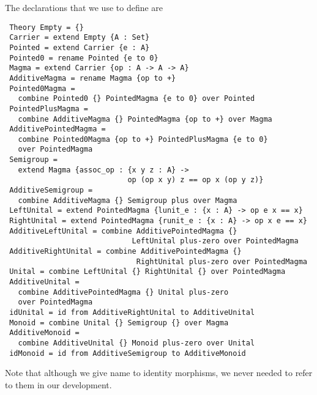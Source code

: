 The declarations that we use to define  are 
\begin{verbatim} 
 Theory Empty = {} 
 Carrier = extend Empty {A : Set}
 Pointed = extend Carrier {e : A}
 Pointed0 = rename Pointed {e to 0} 
 Magma = extend Carrier {op : A -> A -> A}
 AdditiveMagma = rename Magma {op to +} 
 Pointed0Magma = 
   combine Pointed0 {} PointedMagma {e to 0} over Pointed
 PointedPlusMagma = 
   combine AdditiveMagma {} PointedMagma {op to +} over Magma
 AdditivePointedMagma = 
   combine Pointed0Magma {op to +} PointedPlusMagma {e to 0} 
   over PointedMagma
 Semigroup = 
   extend Magma {assoc_op : {x y z : A} -> 
                            op (op x y) z == op x (op y z)}
 AdditiveSemigroup = 
   combine AdditiveMagma {} Semigroup plus over Magma
 LeftUnital = extend PointedMagma {lunit_e : {x : A} -> op e x == x}
 RightUnital = extend PointedMagma {runit_e : {x : A} -> op x e == x}
 AdditiveLeftUnital = combine AdditivePointedMagma {} 
                             LeftUnital plus-zero over PointedMagma 
 AdditiveRightUnital = combine AdditivePointedMagma {} 
                              RightUnital plus-zero over PointedMagma 
 Unital = combine LeftUnital {} RightUnital {} over PointedMagma
 AdditiveUnital = 
   combine AdditivePointedMagma {} Unital plus-zero 
   over PointedMagma
 idUnital = id from AdditiveRightUnital to AdditiveUnital 
 Monoid = combine Unital {} Semigroup {} over Magma
 AdditiveMonoid = 
   combine AdditiveUnital {} Monoid plus-zero over Unital 
 idMonoid = id from AdditiveSemigroup to AdditiveMonoid   
\end{verbatim} 
\noindent Note that although we give name to identity morphisms, we never needed to refer to them in our development. 

